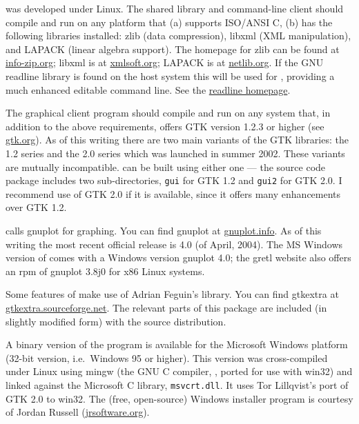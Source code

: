  was developed under Linux. The shared library and
command-line client should compile and run on any platform that (a)
supports ISO/ANSI C, (b) has the following libraries installed: zlib
(data compression), libxml (XML manipulation), and LAPACK (linear
algebra support). The homepage for zlib can be found at
\href{http://www.info-zip.org/pub/infozip/zlib/}{info-zip.org}; libxml
is at \href{http://xmlsoft.org/}{xmlsoft.org}; LAPACK is at
\href{http://www.netlib.org/lapack/}{netlib.org}. If the GNU readline
library is found on the host system this will be used for
, providing a much enhanced editable command line.  See
the
\href{http://cnswww.cns.cwru.edu/~chet/readline/rltop.html}{readline
  homepage}.  

The graphical client program should compile and run on any system
that, in addition to the above requirements, offers GTK version 1.2.3
or higher (see \href{http://www.gtk.org/}{gtk.org}).  As of this
writing there are two main variants of the GTK libraries: the 1.2
series and the 2.0 series which was launched in summer 2002.  These
variants are mutually incompatible.   can be built using
either one --- the source code package includes two sub-directories,
\verb+gui+ for GTK 1.2 and \verb+gui2+ for GTK 2.0.  I recommend use
of GTK 2.0 if it is available, since it offers many enhancements over
GTK 1.2.
  
 calls gnuplot for graphing. You can find gnuplot at
\href{http://www.gnuplot.info/}{gnuplot.info}.  As of this writing the
most recent official release is 4.0 (of April, 2004).  The MS Windows
version of  comes with a Windows version gnuplot 4.0; the
gretl website also offers an rpm of gnuplot 3.8j0 for x86 Linux
systems.
  
Some features of  make use of Adrian Feguin's
 library. You can find gtkextra at
\href{http://gtkextra.sourceforge.net/}{gtkextra.sourceforge.net}.
The relevant parts of this package are included (in slightly modified
form) with the  source distribution.
  
A binary version of the program is available for the Microsoft Windows
platform (32-bit version, i.e.\ Windows 95 or higher). This version was
cross-compiled under Linux using mingw (the GNU C compiler, ,
ported for use with win32) and linked against the Microsoft C library,
\verb+msvcrt.dll+.  It uses Tor Lillqvist's port of GTK 2.0 to win32.
The (free, open-source) Windows installer program is courtesy of
Jordan Russell (\href{http://www.jrsoftware.org/}{jrsoftware.org}).


